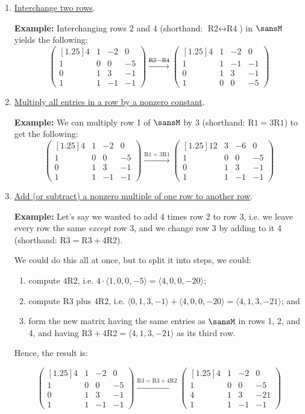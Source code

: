 \documentclass[12 pt]{article}
\newcommand{\pmat}[1]{\begin{pmatrix}[1.25]#1\end{pmatrix}}
\begin{document}
\begin{enumerate}[itemsep=0.25in]
	\item \ul{Interchange two rows}.
	
	\textbf{Example:} Interchanging rows 2 and 4 (shorthand: $\text{R2}\leftrightarrow\text{R4}$) in $\sansM$ yields the following:
	\[
	\pmat{4 & 1 & -2 & 0 \\ 1 & 0 & 0 & -5 \\ 0 & 1 & 3 & -1 \\ 1 & 1 & -1 & -1} \xrightarrow{\text{R2}\leftrightarrow\text{R4}}
	\pmat{4 & 1 & -2 & 0 \\ 1 & 1 & -1 & -1 \\ 0 & 1 & 3 & -1 \\ 1 & 0 & 0 & -5}
	\]
	
	\item \ul{Multiply all entries in a row by a nonzero constant}. 
	
	\textbf{Example:} We can multiply row 1 of $\sansM$ by 3 (shorthand: $\text{R1}=3\text{R1}$) to get the following:
	\[
	\pmat{4 & 1 & -2 & 0 \\ 1 & 0 & 0 & -5 \\ 0 & 1 & 3 & -1 \\ 1 & 1 & -1 & -1} \xrightarrow{\text{R1}=3\text{R1}}
	\pmat{12 & 3 & -6 & 0 \\ 1 & 0 & 0 & -5 \\ 0 & 1 & 3 & -1 \\ 1 & 1 & -1 & -1}
	\]
	
	\newpage
	
	\item \ul{Add (or subtract) a nonzero multiple of one row to another row}.
	
	\textbf{Example:} Let's say we wanted to add 4 times row 2 to row 3, i.e. we leave every row the same \textit{except} row 3, and we change row 3 by adding to it 4 (shorthand: $\text{R3}=\text{R3}+4\text{R2}$).
	
	We could do this all at once, but to split it into steps, we could: 
	\begin{enumerate}[leftmargin=0.5in]
		\item compute $4\text{R2}$, i.e. $4\cdot\langle 1,0,0,-5\rangle=\langle 4,0,0,-20\rangle$;
		\item compute $\text{R3}$ plus $4\text{R2}$, i.e. $\langle 0,1,3,-1\rangle+\langle 4,0,0,-20\rangle=\langle 4,1,3,-21\rangle$; and
		\item form the new matrix having the same entries as $\sansM$ in rows 1, 2, and 4, and having $\text{R3}+4\text{R2}=\langle 4,1,3,-21\rangle$ as its third row. 
	\end{enumerate}

	Hence, the result is:
	
	\[
	\pmat{4 & 1 & -2 & 0 \\ 1 & 0 & 0 & -5 \\ 0 & 1 & 3 & -1 \\ 1 & 1 & -1 & -1} \xrightarrow{\text{R3}=\text{R3}+4\text{R2}}
	\pmat{4 & 1 & -2 & 0 \\ 1 & 0 & 0 & -5 \\ 4 & 1 & 3 & -21 \\ 1 & 1 & -1 & -1}
	\]
\end{enumerate}
\end{document}
